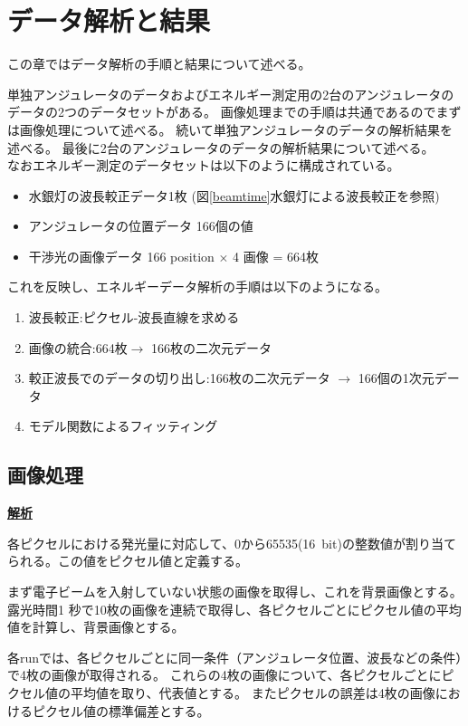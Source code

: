 \documentclass[a4paper,11pt,uplatex]{jsbook}
\begin{document}
\chapter{データ解析と結果}\label{ana}
この章ではデータ解析の手順と結果について述べる。

単独アンジュレータのデータおよびエネルギー測定用の2台のアンジュレータのデータの2つのデータセットがある。
画像処理までの手順は共通であるのでまずは画像処理について述べる。
続いて単独アンジュレータのデータの解析結果を述べる。
最後に2台のアンジュレータのデータの解析結果について述べる。\\
なおエネルギー測定のデータセットは以下のように構成されている。
\begin{itemize}
  \item 水銀灯の波長較正データ1枚 (図\ref{beamtime}水銀灯による波長較正を参照)
  \item アンジュレータの位置データ 166個の値
  \item 干渉光の画像データ 166 position $\times$ 4 画像 = 664枚
\end{itemize}
これを反映し、エネルギーデータ解析の手順は以下のようになる。
\begin{enumerate}
  \item 波長較正:ピクセル-波長直線を求める
  \item 画像の統合:664枚$\rightarrow$ 166枚の二次元データ
  \item 較正波長でのデータの切り出し:166枚の二次元データ $\rightarrow$ 166個の1次元データ
  \item モデル関数によるフィッティング
\end{enumerate}

\section{画像処理}
\noindent \textbf{\underline{解析}}\par
各ピクセルにおける発光量に対応して、0から65535(16~bit)の整数値が割り当てられる。この値をピクセル値と定義する。

まず電子ビームを入射していない状態の画像を取得し、これを背景画像とする。露光時間1 秒で10枚の画像を連続で取得し、各ピクセルごとにピクセル値の平均値を計算し、背景画像とする。

各runでは、各ピクセルごとに同一条件（アンジュレータ位置、波長などの条件）で4枚の画像が取得される。
これらの4枚の画像について、各ピクセルごとにピクセル値の平均値を取り、代表値とする。
またピクセルの誤差は4枚の画像におけるピクセル値の標準偏差とする。
\end{document}
